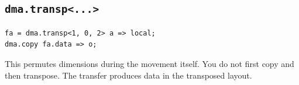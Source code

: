 \subsection*{\texttt{dma.\allowbreak{}transp\textless{}.\allowbreak{}.\allowbreak{}.\allowbreak{}\textgreater{}}}

\begin{lstlisting}[language=croqtile,caption={dma.transp ...}]
fa = dma.transp<1, 0, 2> a => local;
dma.copy fa.data => o;
\end{lstlisting}

This permutes dimensions during the movement itself. You do not first copy and then transpose. The transfer produces data in the transposed layout.
